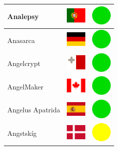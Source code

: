 \documentclass[12pt, a4paper, twoside]{report}
\begin{document}
\begin{center}
\begin{longtable}{|p{5cm}|p{2cm}|p{2cm}|}
 Analepsy                                                   & \includegraphics[width=1cm]{../4x3/pt} &   \includegraphics[width=1cm]{../likes/y} \\ \hline
 Anasarca                                                   & \includegraphics[width=1cm]{../4x3/de} &   \includegraphics[width=1cm]{../likes/y} \\ \hline
 Angelcrypt                                                 & \includegraphics[width=1cm]{../4x3/mt} &   \includegraphics[width=1cm]{../likes/y} \\ \hline
 AngelMaker                                                 & \includegraphics[width=1cm]{../4x3/ca} &   \includegraphics[width=1cm]{../likes/y} \\ \hline
 Angelus Apatrida                                           & \includegraphics[width=1cm]{../4x3/es} &   \includegraphics[width=1cm]{../likes/y} \\ \hline
 Angstskíg                                                  & \includegraphics[width=1cm]{../4x3/dk} &   \includegraphics[width=1cm]{../likes/m} \\ \hline

\end{longtable}
\end{center}
\end{document}
